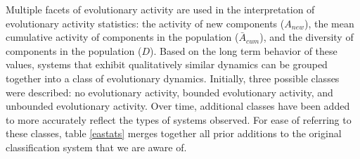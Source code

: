 \documentclass[letterpaper]{article}
\begin{document}
Multiple facets of evolutionary activity are used in the interpretation of evolutionary activity statistics: the activity of new components ($A_{new}$), the mean cumulative activity of components in the population ($\bar{A}_{cum}$), and the diversity of components in the population ($D$). Based on the long term behavior of these values, systems that exhibit qualitatively similar dynamics can be grouped together into a class of evolutionary dynamics. Initially, three possible classes were described: no evolutionary activity, bounded evolutionary activity, and unbounded evolutionary activity. Over time, additional classes have been added to more accurately reflect the types of systems observed. For ease of referring to these classes, table \ref{eastats} merges together all prior additions to the original classification system that we are aware of.
\end{document}
